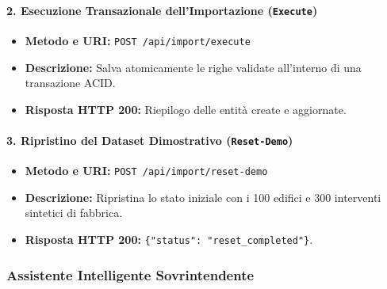 \paragraph{2. Esecuzione Transazionale dell'Importazione (\texttt{Execute})}
\begin{itemize}[leftmargin=1.4em, itemsep=0.1em]
    \item \textbf{Metodo e URI:} \texttt{POST /api/import/execute}
    \item \textbf{Descrizione:} Salva atomicamente le righe validate all'interno di una transazione ACID.
    \item \textbf{Risposta HTTP 200:} Riepilogo delle entità create e aggiornate.
\end{itemize}

\paragraph{3. Ripristino del Dataset Dimostrativo (\texttt{Reset-Demo})}
\begin{itemize}[leftmargin=1.4em, itemsep=0.1em]
    \item \textbf{Metodo e URI:} \texttt{POST /api/import/reset-demo}
    \item \textbf{Descrizione:} Ripristina lo stato iniziale con i 100 edifici e 300 interventi sintetici di fabbrica.
    \item \textbf{Risposta HTTP 200:} \texttt{\{"status": "reset\_completed"\}}.
\end{itemize}

\subsubsection{Assistente Intelligente Sovrintendente}

